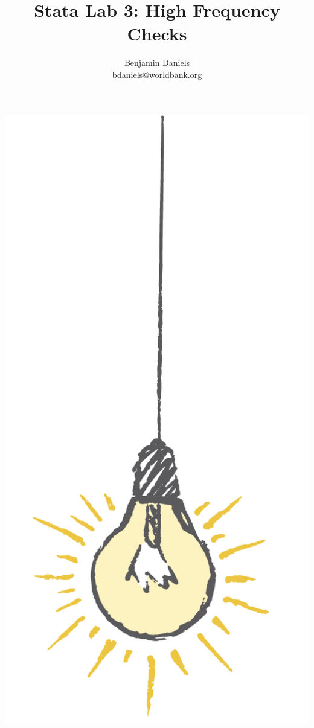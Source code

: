 \documentclass{tufte-handout}
\title{Stata Lab 3: High Frequency Checks}
\author{Benjamin Daniels \\ bdaniels@worldbank.org}
\begin{document}
\maketitle%

\begin{marginfigure}%
  \includegraphics[width=\linewidth]{light.png}
\end{marginfigure}
\end{document}
